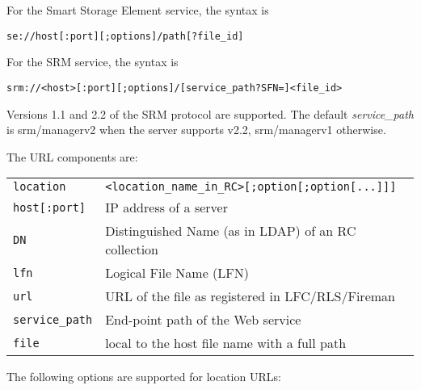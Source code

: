 For the Smart Storage Element service, the syntax is
\begin{shaded}
   \verb#se://host[:port][;options]/path[?file_id]#
\end{shaded}

For the SRM service, the syntax is
\begin{shaded}
   \verb#srm://<host>[:port][;options]/[service_path?SFN=]<file_id>#
\end{shaded}

Versions 1.1 and 2.2 of the SRM protocol are supported. The
default \emph{service\_path} is srm/managerv2 when the server supports
v2.2, srm/managerv1 otherwise.

The URL components are:

\begin{tabular}{lp{10cm}}
   \verb#location#&\verb#<location_name_in_RC>[;option[;option[...]]]#\\
   \verb#host[:port]#&IP address of a server\\
   \verb#DN#&Distinguished Name (as in LDAP) of an RC collection\\
   \verb#lfn#&Logical File Name (LFN)\\
   \verb#url#&URL of the file as registered in LFC/RLS/Fireman\\
   \verb#service_path#&End-point path of the Web service\\
   \verb#file#&local to the host file name with a full path\\
\end{tabular}

The following options are supported for location URLs:

